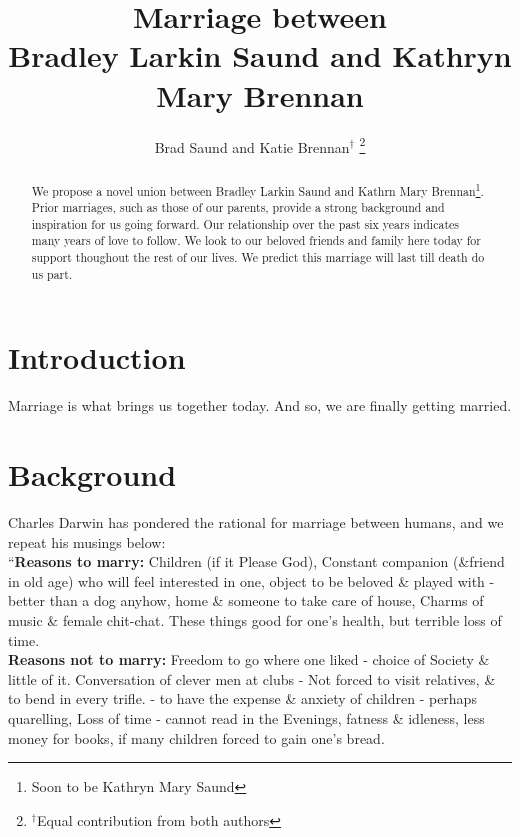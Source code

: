\documentclass[letterpaper, 11 pt, conference]{ieeeconf}
\title{\LARGE \bf
  Marriage between \\
  Bradley Larkin Saund and Kathryn Mary Brennan
}
\author{Brad Saund and Katie Brennan$^{\dagger}$
\thanks{${^\dagger}$Equal contribution from both authors}%
}
\begin{document}
\maketitle
\thispagestyle{empty}
\pagestyle{empty}


\begin{abstract}
  We propose a novel union between Bradley Larkin Saund and Kathrn Mary Brennan\footnote{Soon to be Kathryn Mary Saund}.
  Prior marriages, such as those of our parents, provide a strong background and inspiration for us going forward.
  Our relationship over the past six years indicates many years of love to follow.
  We look to our beloved friends and family here today for support thoughout the rest of our lives.
  We predict this marriage will last till death do us part.
  
\end{abstract}


\section{Introduction}
Marriage is what brings us together today\cite{PrincessBride}.
And so, we are finally getting married\cite{AladdinKoT}.


\section{Background}
Charles Darwin has pondered the rational for marriage between humans, and we repeat his musings below:\\
``\textbf{Reasons to marry:} Children (if it Please God), Constant companion (\&friend in old age) who will feel interested in one, object to be beloved \& played with - better than a dog anyhow, home \& someone to take care of house, Charms of music \& female chit-chat. These things good for one's health, but terrible loss of time.\\
\textbf{Reasons not to marry:} Freedom to go where one liked - choice of Society \& little of it. Conversation of clever men at clubs - Not forced to visit relatives, \& to bend in every trifle. - to have the expense \& anxiety of children - perhaps quarelling, Loss of time - cannot read in the Evenings, fatness \& idleness, less money for books, if many children forced to gain one's bread.
\end{document}
